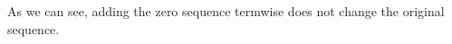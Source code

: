 \documentclass[preview]{standalone}
\begin{document}
\begin{center}
As we can see, adding the zero sequence termwise does not change the original sequence.
\end{center}
\end{document}
